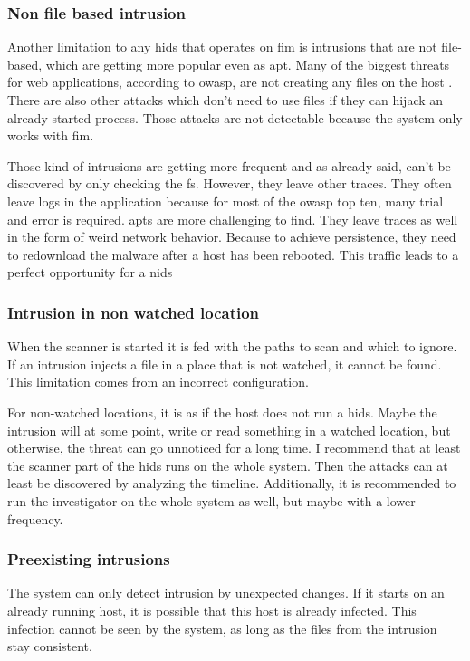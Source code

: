 \subsubsection{Non file based \gls{intrusion}}
\label{sec:limitation:nonFileBased}
Another limitation to any \gls{hids} that operates on \gls{fim} is \glspl{intrusion} that are not file-based, which are getting more popular even as \gls{apt}. Many of the biggest threats for web applications, according to \gls{owasp}, are not creating any files on the host \cite{owasp}. There are also other attacks which don't need to use files if they can hijack an already started process. Those attacks are not detectable because the system only works with \gls{fim}.

Those kind of \glspl{intrusion} are getting more frequent and as already said, can't be discovered by only checking the \gls{fs}. However, they leave other traces. They often leave logs in the application because for most of the \gls{owasp} top ten, many trial and error is required. \gls{apt}s are more challenging to find. They leave traces as well in the form of weird network behavior. Because to achieve persistence, they need to redownload the malware after a host has been rebooted. This traffic leads to a perfect opportunity for a \gls{nids}

\subsubsection{Intrusion in non watched location}
\label{sec:limitation:nonWatched}
When the scanner is started it is fed with the paths to scan and which to ignore. If an \gls{intrusion} injects a file in a place that is not watched, it cannot be found. This limitation comes from an incorrect configuration.

For non-watched locations, it is as if the host does not run a \gls{hids}. Maybe the \gls{intrusion} will at some point, write or read something in a watched location, but otherwise, the threat can go unnoticed for a long time. I recommend that at least the scanner part of the \gls{hids} runs on the whole system. Then the attacks can at least be discovered by analyzing the timeline. Additionally, it is recommended to run the investigator on the whole system as well, but maybe with a lower frequency.

\subsubsection{Preexisting \glspl{intrusion}}
\label{sec:limitation:preexisting}
The system can only detect \gls{intrusion} by unexpected changes. If it starts on an already running host, it is possible that this host is already infected. This infection cannot be seen by the system, as long as the files from the \gls{intrusion} stay consistent. 

